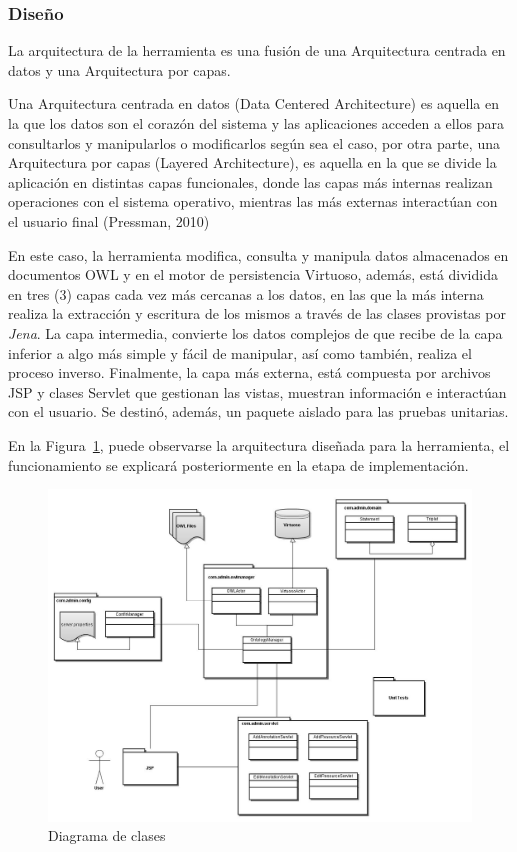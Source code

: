 \begin{itemize}
\subsubsection{Diseño}
La arquitectura de la herramienta es una fusión de una Arquitectura centrada en datos y una Arquitectura por capas.  

Una Arquitectura centrada en datos (Data Centered Architecture) es aquella en la que los datos son el corazón del sistema y las aplicaciones acceden a ellos para consultarlos y manipularlos o modificarlos según sea el caso, por otra parte, una Arquitectura por capas (Layered Architecture), es aquella en la que se divide la aplicación en distintas capas funcionales, donde las capas más internas realizan operaciones con el sistema operativo, mientras las más externas interactúan con el usuario final (Pressman, 2010)

En este caso, la herramienta modifica, consulta y manipula datos almacenados en documentos OWL y en el motor de persistencia Virtuoso, además, está dividida en tres (3) capas cada vez más cercanas a los datos, en las que la más interna realiza la extracción y escritura de los mismos a través de las clases provistas por \textit{Jena}. La capa intermedia, convierte los datos complejos de que recibe de la capa inferior a algo más simple y fácil de manipular, así como también, realiza el proceso inverso. Finalmente, la capa más externa, está compuesta por archivos JSP y clases Servlet que gestionan las vistas, muestran información e interactúan con el usuario. Se destinó, además, un paquete aislado para las pruebas unitarias.

En la Figura~\ref{adminClassDiagram}, puede observarse la arquitectura diseñada para la herramienta, el funcionamiento se explicará posteriormente en la etapa de implementación.

\newpage

\begin{figure}[!h]
    \begin{center}
        \includegraphics[scale=0.4]{images/admin_app_class_diagram.jpg}
        \caption{Diagrama de clases}
        \label{adminClassDiagram}
    \end{center}
\end{figure}


\end{itemize}
